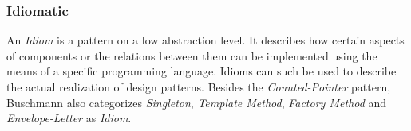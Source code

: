 %
%
%
%
%
%
%

\subsubsection{Idiomatic}
\label{idiomatic_heading}

An \emph{Idiom} is a pattern on a low abstraction level. It describes how certain
aspects of components or the relations between them can be implemented using the
means of a specific programming language. Idioms can such be used to describe
the actual realization of design patterns. Besides the \emph{Counted-Pointer}
pattern, Buschmann \cite[p. 377]{buschmann} also categorizes \emph{Singleton},
\emph{Template Method}, \emph{Factory Method} and \emph{Envelope-Letter}
\cite{coplien} as \emph{Idiom}.




